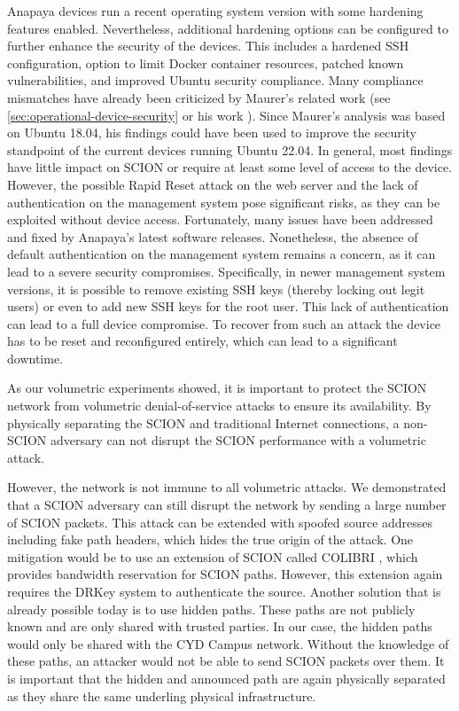 Anapaya devices run a recent operating system version with some hardening features enabled.
Nevertheless, additional hardening options can be configured to further enhance the security of the devices.
This includes a hardened SSH configuration, option to limit Docker container resources, patched known vulnerabilities, and improved Ubuntu security compliance.
Many compliance mismatches have already been criticized by Maurer's related work (see \cref{sec:operational-device-security} or his work \cite{Maurer2021}).
Since Maurer's analysis was based on Ubuntu 18.04, his findings could have been used to improve the security standpoint of the current devices running Ubuntu 22.04.
In general, most findings have little impact on SCION or require at least some level of access to the device.
However, the possible Rapid Reset attack on the web server and the lack of authentication on the management system pose significant risks, as they can be exploited without device access.
Fortunately, many issues have been addressed and fixed by Anapaya's latest software releases.
Nonetheless, the absence of default authentication on the management system remains a concern, as it can lead to a severe security compromises.
Specifically, in newer management system versions, it is possible to remove existing SSH keys (thereby locking out legit users) or even to add new SSH keys for the root user.
This lack of authentication can lead to a full device compromise.
To recover from such an attack the device has to be reset and reconfigured entirely, which can lead to a significant downtime.

As our volumetric experiments showed, it is important to protect the SCION network from volumetric denial-of-service attacks to ensure its availability.
By physically separating the SCION and traditional Internet connections, a non-SCION adversary can not disrupt the SCION performance with a volumetric attack.

However, the network is not immune to all volumetric attacks.
We demonstrated that a SCION adversary can still disrupt the network by sending a large number of SCION packets.
This attack can be extended with spoofed source addresses including fake path headers, which hides the true origin of the attack.
One mitigation would be to use an extension of SCION called COLIBRI \cite[Section 10.2]{Perrig2022}, which provides bandwidth reservation for SCION paths.
However, this extension again requires the DRKey system to authenticate the source.
Another solution that is already possible today is to use hidden paths.
These paths are not publicly known and are only shared with trusted parties.
In our case, the hidden paths would only be shared with the CYD Campus network.
Without the knowledge of these paths, an attacker would not be able to send SCION packets over them.
It is important that the hidden and announced path are again physically separated as they share the same underling physical infrastructure.


